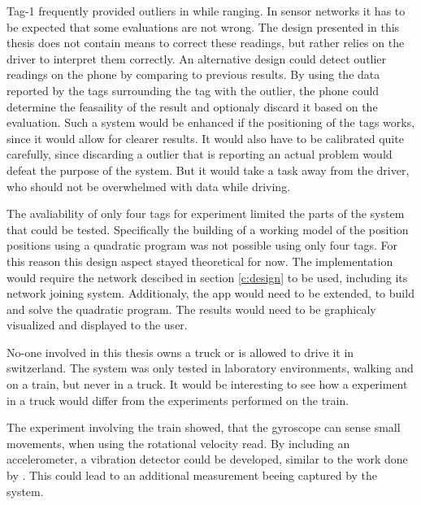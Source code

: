 Tag-1 frequently provided outliers in while ranging.
In sensor networks it has to be expected that some evaluations are not wrong.
The design presented in this thesis does not contain means to correct these readings, but rather relies on the driver to interpret them correctly.
An alternative design could detect outlier readings on the phone by comparing to previous results.
By using the data reported by the tags surrounding the tag with the outlier, the phone could determine the feasaility of the result and optionaly discard it based on the evaluation.
Such a system would be enhanced if the positioning of the tags works, since it would allow for clearer results.
It would also have to be calibrated quite carefully, since discarding a outlier that is reporting an actual problem would defeat the purpose of the system.
But it would take a task away from the driver, who should not be overwhelmed with data while driving.


The avaliability of only four tags for experiment limited the parts of the system that could be tested.
Specifically the building of a working model of the position positions using a quadratic program was not possible using only four tags.
For this reason this design aspect stayed theoretical for now.
The implementation would require the network descibed in section \ref{c:design} to be used, including its network joining system.
Additionaly, the app would need to be extended, to build and solve the quadratic program.
The results would need to be graphicaly visualized and displayed to the user.


No-one involved in this thesis owns a truck or is allowed to drive it in switzerland.
The system was only tested in laboratory environments, walking and on a train, but never in a truck.
It would be interesting to see how a experiment in a truck would differ from the experiments performed on the train.


The experiment involving the train showed, that the gyroscope can sense small movements, when using the rotational velocity read.
By including an accelerometer, a vibration detector could be developed, similar to the work done by \cite{khan2007simple}.
This could lead to an additional measurement beeing captured by the system.

